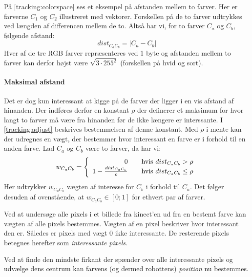 På \cref{tracking:colorspace} ses et eksempel på afstanden mellem to farver.
Her er farverne $C_1$ og $C_2$ illustreret med vektorer.
Forskellen på de to farver udtrykkes ved længden af differencen mellem de to.
Altså har vi, for to farver $C_a$ og $C_b$, følgende afstand:
\begin{equation}
dist_{C_aC_b} = |C_a - C_b|
\end{equation}
Hver af de tre RGB farver repræsenteres ved 1 byte og afstanden mellem to farver kan derfor højst være $\sqrt{3 \cdot 255^2}$ (forskellen på hvid og sort).

\paragraph{Maksimal afstand}
Det er dog kun interessant at kigge på de farver der ligger i en vis afstand af hinanden.
Der indføres derfor en konstant $\rho$ der definerer et maksimum for hvor langt to farver må være fra hinanden før de ikke længere er interssante.
I \cref{tracking:adjust} beskrives bestemmelsen af denne konstant.
Med $\rho$ i mente kan der udregnes en vægt, der bestemmer hvor interessant en farve er i forhold til en anden farve.
Lad $C_a$ og $C_b$ være to farver, da har vi:
\begin{equation}
w_{C_aC_b} = \left\{ 
  \begin{array}{r l}
        0 & \quad \text{hvis $dist_{C_aC_b} > \rho$} \\
       1 - \frac{dist_{C_aC_b}}{\rho} & \quad \text{hvis $dist_{C_aC_b} \leq \rho$}
  \end{array} \right.
\end{equation}
Her udtrykker $w_{C_aC_b}$ vægten af interesse for $C_b$ i forhold til $C_a$.
Det følger desuden af ovenstående, at $w_{C_aC_b} \in [0;1]$ for ethvert par af farver.

Ved at undersøge alle pixels i et billede fra kinect'en ud fra en bestemt farve kan vægten af alle pixels bestemmes.
Vægten af en pixel beskriver hvor interessant den er.
Således er pixels med vægt 0 ikke interessante.
De resterende pixels betegnes herefter som \emph{interessante pixels}.

Ved at finde den mindste firkant der spænder over alle interessante pixels og udvælge dens centrum kan farvens (og dermed robottens) \textit{position} nu bestemmes.

